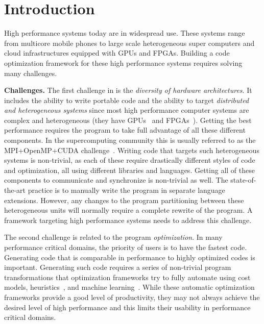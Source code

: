 \section{Introduction}
\label{sec:intro}

High performance systems today are in widespread use.  These systems range from multicore mobile phones to large scale heterogeneous super computers and cloud infrastructures equipped with GPUs and FPGAs.  Building a code optimization framework for these high performance systems requires solving many challenges.

\textbf{Challenges.}
The first challenge in is the \emph{diversity of hardware architectures}. It includes the ability to write portable code and the ability to target \emph{distributed and heterogeneous systems} since most high performance computer systems are complex and heterogeneous (they have GPUs~\cite{liao2014milkyway} and FPGAs~\cite{caulfield2017configurable}).
Getting the best performance requires the program to take full advantage of all these different components.  In the supercomputing community this is usually referred to as the MPI+OpenMP+CUDA challenge~\cite{yang2011hybrid}.
Writing code that targets such heterogeneous systems is non-trivial, as each of these require drastically different styles of code and optimization, all using different libraries and languages.  Getting all of these components to communicate and synchronize is non-trivial as well. The state-of-the-art practice is to manually write the program in separate language extensions. However, any changes to the program partitioning between these heterogeneous units will normally require a complete rewrite of the program.  A framework targeting high performance systems needs to address this challenge.

The second challenge is related to the program \emph{optimization}.  In many performance critical domains, the priority of users is to have the fastest code.  Generating code that is comparable in performance to highly optimized codes is important.  
Generating such code requires a series of non-trivial program transformations that optimization frameworks try to fully automate using cost models, heuristics~\cite{hall1995detecting}, and machine learning~\cite{tournavitis2009towards}.
While these automatic optimization frameworks provide a good level of productivity, they may not always achieve the desired level of high performance and this limits their usability in performance critical domains.

